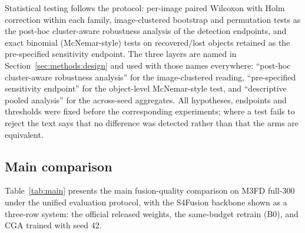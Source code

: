 \documentclass[pdflatex,sn-mathphys-num]{sn-jnl}
\theoremstyle{thmstyleone}%
\theoremstyle{thmstyletwo}%
\theoremstyle{thmstylethree}%
\begin{document}
Statistical testing follows the protocol: per-image paired Wilcoxon with Holm correction within each family, image-clustered bootstrap and permutation tests as the post-hoc cluster-aware robustness analysis of the detection endpoints, and exact binomial (McNemar-style) tests on recovered/lost objects retained as the pre-specified sensitivity endpoint. The three layers are named in Section~\ref{sec:methods:design} and used with those names everywhere: ``post-hoc cluster-aware robustness analysis'' for the image-clustered reading, ``pre-specified sensitivity endpoint'' for the object-level McNemar-style test, and ``descriptive pooled analysis'' for the across-seed aggregates. All hypotheses, endpoints and thresholds were fixed before the corresponding experiments; where a test fails to reject the text says that no difference was detected rather than that the arms are equivalent.

\subsection{Main comparison}\label{sec:exp:main}

Table~\ref{tab:main} presents the main fusion-quality comparison on M3FD full-300 under the unified evaluation protocol, with the S4Fusion backbone shown as a three-row system: the official released weights, the same-budget retrain (B0), and CGA trained with seed 42.
\end{document}
